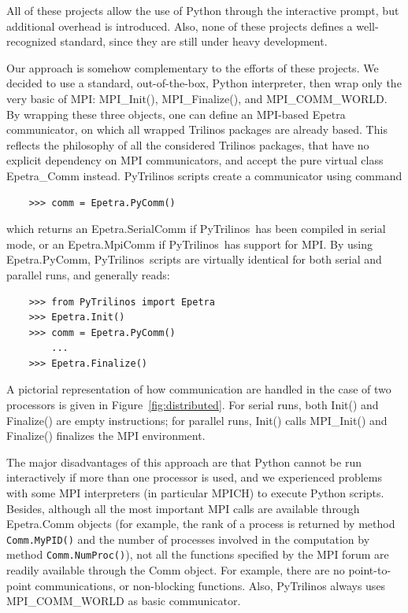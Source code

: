 \documentclass[10pt,relax]{SANDreport}
\newcommand{\PyTrilinos}{{PyTrilinos}}
\begin{document}
All of these projects allow the use of Python through the
interactive prompt,
  but additional overhead is introduced. Also, none of these projects
  defines a well-recognized standard, since they are still under heavy
  development.

Our approach is somehow complementary to the efforts of these projects.
We decided to use a standard, out-of-the-box, Python interpreter, then wrap
only the very basic of MPI:
MPI\_Init(), MPI\_Finalize(), and MPI\_COMM\_WORLD. By wrapping these three
objects, one can define an MPI-based Epetra communicator, on which
all wrapped Trilinos packages are already
based. This reflects the philosophy of all the
considered
Trilinos packages, that have no explicit dependency on MPI communicators, and
accept the pure virtual class Epetra\_Comm instead. PyTrilinos scripts create
a communicator using command
\begin{verbatim}
    >>> comm = Epetra.PyComm()
\end{verbatim}
which returns an Epetra.SerialComm if \PyTrilinos\ has been compiled
in serial mode, or an Epetra.MpiComm if \PyTrilinos\ has support for
MPI. By using Epetra.PyComm, \PyTrilinos\ scripts are virtually
identical for both serial and parallel runs, and generally reads:
\begin{verbatim}
    >>> from PyTrilinos import Epetra
    >>> Epetra.Init()
    >>> comm = Epetra.PyComm()
        ...
    >>> Epetra.Finalize()
\end{verbatim}
A pictorial representation of how communication are handled in
the case of two  processors is given in Figure~\ref{fig:distributed}. For
serial runs, both Init() and Finalize() are empty instructions; for parallel
runs, Init() calls MPI\_Init() and Finalize() finalizes the MPI environment.

\smallskip

The major disadvantages of this approach are that Python cannot be run
interactively if more than one processor is used, and we experienced problems
with some MPI interpreters (in particular MPICH) to execute Python scripts.
Besides, although all the most important MPI calls are available through
Epetra.Comm objects (for example, the rank of a process is returned by method
                     {\tt Comm.MyPID()} and the number of processes involved in
                     the computation by method {\tt Comm.NumProc()}), not all
the functions specified by the MPI forum are readily available through the
Comm object.  For example, there are no point-to-point communications, or
non-blocking functions. Also, PyTrilinos always uses MPI\_COMM\_WORLD as basic
communicator.
\end{document}
